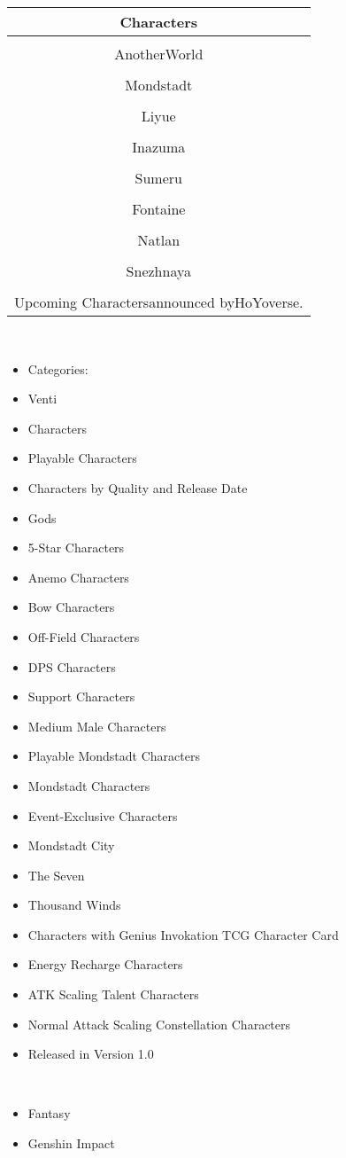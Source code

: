 \documentclass[a4paper,12pt]{article}
\begin{document}
\begin{tabular}{|c|} \hline
Characters \\
 \hline
 \\
AnotherWorld &  \\
 \\
Mondstadt &  \\
 \\
Liyue &  \\
 \\
Inazuma &  \\
 \\
Sumeru &  \\
 \\
Fontaine &  \\
 \\
Natlan &  \\
 \\
Snezhnaya &  \\
 \\
Upcoming Charactersannounced byHoYoverse. \\
\end{tabular}\\ \par \vspace{0.5cm}

\begin{itemize}
\item Categories:
\item Venti
\item Characters
\item Playable Characters
\item Characters by Quality and Release Date
\item Gods
\item 5-Star Characters
\item Anemo Characters
\item Bow Characters
\item Off-Field Characters
\item DPS Characters
\item Support Characters
\item Medium Male Characters
\item Playable Mondstadt Characters
\item Mondstadt Characters
\item Event-Exclusive Characters
\item Mondstadt City
\item The Seven
\item Thousand Winds
\item Characters with Genius Invokation TCG Character Card
\item Energy Recharge Characters
\item ATK Scaling Talent Characters
\item Normal Attack Scaling Constellation Characters
\item Released in Version 1.0
\end{itemize}\\ \par \vspace{0.5cm}

\begin{itemize}
\item Fantasy
\item Genshin Impact
\end{itemize}\\ \par \vspace{0.5cm}
\end{document}
